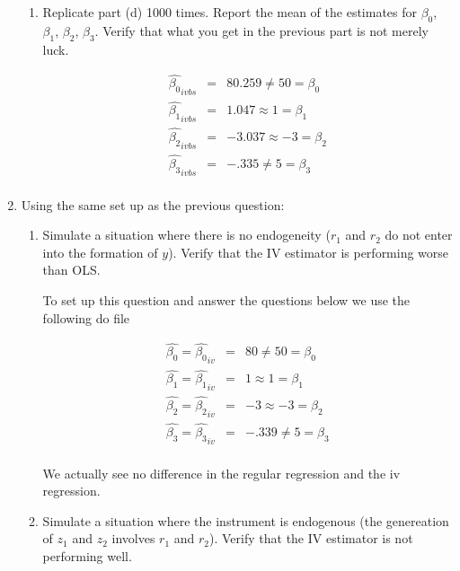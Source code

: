 \documentclass[11pt]{SelfArxOneColBMN}
\begin{document}
\begin{enumerate}
\begin{enumerate}
    \item Replicate part (d) 1000 times. Report the mean of the estimates for $\beta_0$, $\beta_1$, $\beta_2$, $\beta_3$. Verify that what you get in the previous part is not merely luck.
    \begin{solution}
      \begin{eqnarray*}
          \hat{\beta_0}_{ivbs} &=& 80.259  \neq 50 = \beta_0\\
          \hat{\beta_1}_{ivbs} &=& 1.047 \approx 1 = \beta_1\\
          \hat{\beta_2}_{ivbs} &=& -3.037\approx -3 = \beta_2\\
          \hat{\beta_3}_{ivbs} &=& -.335 \neq 5 = \beta_3\\
        \end{eqnarray*}
    \end{solution}
  \end{enumerate}
  \item Using the same set up as the previous question:
  \begin{enumerate}
    \item Simulate a situation where there is no endogeneity ($r_1$ and $r_2$ do not enter into the formation of $y$). Verify that the IV estimator is performing worse than OLS.
    \begin{solution}
    To set up this question and answer the questions below we use the following do file
      \singlespacing
      
      \onehalfspacing
      \begin{eqnarray*}
          \hat{\beta_0} = \hat{\beta_0}_{iv} &=& 80  \neq 50 = \beta_0\\
          \hat{\beta_1} = \hat{\beta_1}_{iv} &=& 1 \approx 1 = \beta_1\\
          \hat{\beta_2} = \hat{\beta_2}_{iv} &=& -3 \approx -3 = \beta_2\\
          \hat{\beta_3} = \hat{\beta_3}_{iv} &=& -.339 \neq 5 = \beta_3\\
        \end{eqnarray*}
    \end{solution}
    We actually see no difference in the regular regression and the iv regression.
    \item Simulate a situation where the instrument is endogenous (the genereation of $z_1$ and $z_2$ involves $r_1$ and $r_2$). Verify that the IV estimator is not performing well.
    \begin{solution}

\end{solution}
\end{enumerate}
\end{enumerate}
\end{document}
